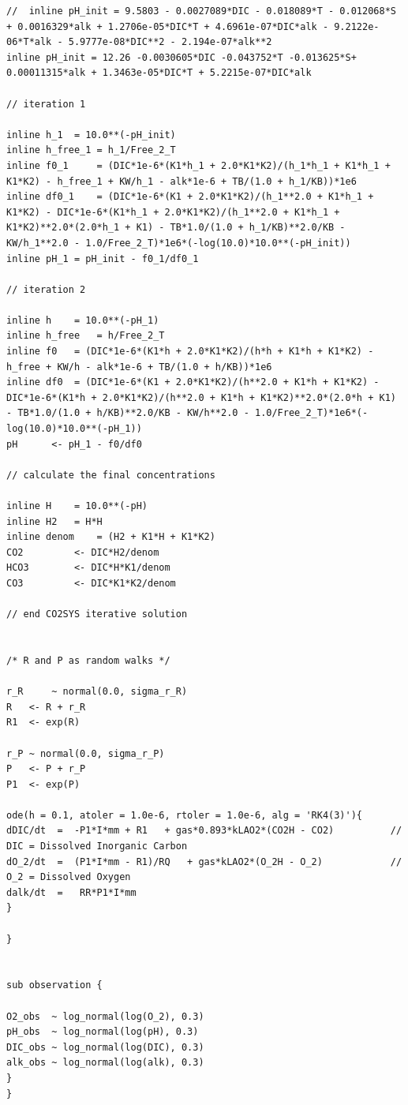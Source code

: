 \documentclass{ruthesis}
\begin{document}
\begin{verbatim}
//	inline pH_init = 9.5803 - 0.0027089*DIC - 0.018089*T - 0.012068*S + 0.0016329*alk + 1.2706e-05*DIC*T + 4.6961e-07*DIC*alk - 9.2122e-06*T*alk - 5.9777e-08*DIC**2 - 2.194e-07*alk**2 
inline pH_init = 12.26 -0.0030605*DIC -0.043752*T -0.013625*S+ 0.00011315*alk + 1.3463e-05*DIC*T + 5.2215e-07*DIC*alk

// iteration 1

inline h_1 	= 10.0**(-pH_init)
inline h_free_1	= h_1/Free_2_T
inline f0_1 	= (DIC*1e-6*(K1*h_1 + 2.0*K1*K2)/(h_1*h_1 + K1*h_1 + K1*K2) - h_free_1 + KW/h_1 - alk*1e-6 + TB/(1.0 + h_1/KB))*1e6
inline df0_1 	= (DIC*1e-6*(K1 + 2.0*K1*K2)/(h_1**2.0 + K1*h_1 + K1*K2) - DIC*1e-6*(K1*h_1 + 2.0*K1*K2)/(h_1**2.0 + K1*h_1 + K1*K2)**2.0*(2.0*h_1 + K1) - TB*1.0/(1.0 + h_1/KB)**2.0/KB - KW/h_1**2.0 - 1.0/Free_2_T)*1e6*(-log(10.0)*10.0**(-pH_init))
inline pH_1	= pH_init - f0_1/df0_1

// iteration 2

inline h 	= 10.0**(-pH_1)
inline h_free 	= h/Free_2_T
inline f0 	= (DIC*1e-6*(K1*h + 2.0*K1*K2)/(h*h + K1*h + K1*K2) - h_free + KW/h - alk*1e-6 + TB/(1.0 + h/KB))*1e6
inline df0 	= (DIC*1e-6*(K1 + 2.0*K1*K2)/(h**2.0 + K1*h + K1*K2) - DIC*1e-6*(K1*h + 2.0*K1*K2)/(h**2.0 + K1*h + K1*K2)**2.0*(2.0*h + K1) - TB*1.0/(1.0 + h/KB)**2.0/KB - KW/h**2.0 - 1.0/Free_2_T)*1e6*(-log(10.0)*10.0**(-pH_1))
pH 		<- pH_1 - f0/df0    

// calculate the final concentrations

inline H 	= 10.0**(-pH)
inline H2 	= H*H
inline denom 	= (H2 + K1*H + K1*K2)
CO2  		<- DIC*H2/denom
HCO3 		<- DIC*H*K1/denom
CO3  		<- DIC*K1*K2/denom  

// end CO2SYS iterative solution


/* R and P as random walks */

r_R 	~ normal(0.0, sigma_r_R)
R 	<- R + r_R
R1 	<- exp(R)

r_P ~ normal(0.0, sigma_r_P)
P 	<- P + r_P
P1 	<- exp(P)

ode(h = 0.1, atoler = 1.0e-6, rtoler = 1.0e-6, alg = 'RK4(3)'){
dDIC/dt  =  -P1*I*mm + R1 	+ gas*0.893*kLAO2*(CO2H - CO2)  		// DIC = Dissolved Inorganic Carbon 
dO_2/dt	 =  (P1*I*mm - R1)/RQ 	+ gas*kLAO2*(O_2H - O_2)	 		// O_2 = Dissolved Oxygen 
dalk/dt  =   RR*P1*I*mm
}

}


sub observation {

O2_obs  ~ log_normal(log(O_2), 0.3)
pH_obs  ~ log_normal(log(pH), 0.3)
DIC_obs ~ log_normal(log(DIC), 0.3) 
alk_obs ~ log_normal(log(alk), 0.3)
}
}
\end{verbatim}
\end{document}
